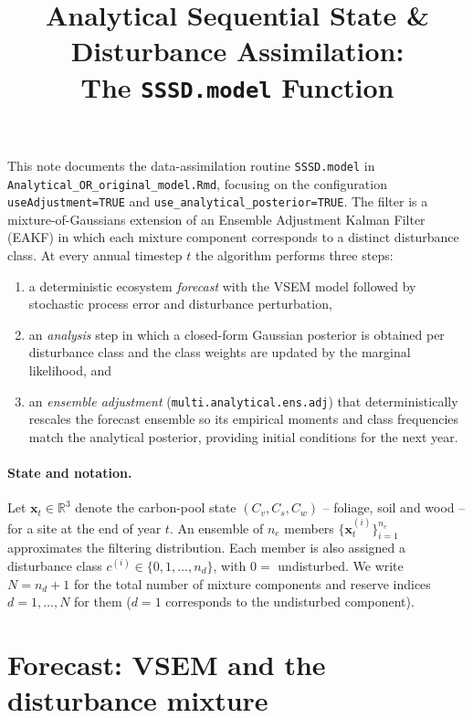 \documentclass[11pt]{article}
\title{Analytical Sequential State \& Disturbance Assimilation: \\
       The \texttt{SSSD.model} Function}
\author{}
\date{}
\newcommand{\R}{\mathbb{R}}
\begin{document}
\maketitle

\noindent
This note documents the data-assimilation routine
\texttt{SSSD.model} in
\texttt{Analytical\_OR\_original\_model.Rmd}, focusing on the
configuration \texttt{useAdjustment=TRUE} and
\texttt{use\_analytical\_posterior=TRUE}.  The filter is a
mixture-of-Gaussians extension of an Ensemble Adjustment Kalman
Filter (EAKF) in which each mixture component corresponds to a
distinct disturbance class.  At every annual timestep $t$ the
algorithm performs three steps:
\begin{enumerate}
\item a deterministic ecosystem \emph{forecast} with the VSEM model
      followed by stochastic process error and disturbance perturbation,
\item an \emph{analysis} step in which a closed-form Gaussian posterior
      is obtained per disturbance class and the class weights are
      updated by the marginal likelihood, and
\item an \emph{ensemble adjustment} (\texttt{multi.analytical.ens.adj})
      that deterministically rescales the forecast ensemble so its
      empirical moments and class frequencies match the analytical
      posterior, providing initial conditions for the next year.
\end{enumerate}

\paragraph{State and notation.}
Let $\bm x_t \in \R^{3}$ denote the carbon-pool state
$(C_v, C_s, C_w)$ -- foliage, soil and wood -- for a site at the end of
year $t$.  An ensemble of $n_e$ members
$\{\bm x_t^{(i)}\}_{i=1}^{n_e}$ approximates the filtering distribution.
Each member is also assigned a disturbance class
$c^{(i)} \in \{0, 1, \dots, n_d\}$, with $0 = $ undisturbed.  We write
$N = n_d + 1$ for the total number of mixture components and reserve
indices $d = 1, \dots, N$ for them ($d = 1$ corresponds to the
undisturbed component).

\bigskip

\section{Forecast: VSEM and the disturbance mixture}
\label{sec:forecast}
\end{document}
